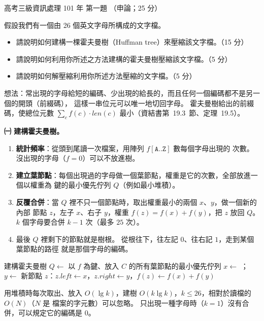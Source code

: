 \begin{pastexam}[label={px:gk3-101-ds-01}]{高考三級資訊處理 101 年 第一題}
（申論；25 分）

假設我們有一個由 26 個英文字母所構成的文字檔。
\begin{itemize}[leftmargin=2em, labelsep=0.3em, itemsep=2pt]
\item[㈠] 請說明如何建構一棵霍夫曼樹（Huffman tree）來壓縮該文字檔。（15 分）
\item[㈡] 請說明如何利用你所述之方法建構的霍夫曼樹壓縮該文字檔。（5 分）
\item[㈢] 請說明如何解壓縮利用你所述方法壓縮的文字檔。（5 分）
\end{itemize}
\end{pastexam}

\begin{pastsoln}
想法：常出現的字母給短的編碼、少出現的給長的，而且任何一個編碼都不是另一個的開頭（前綴碼），
這樣一串位元可以唯一地切回字母。 霍夫曼樹給出的前綴碼，使總位元數 $\sum_c f(c) \cdot
\mathit{len}(c)$ 最小（資結書第~19.3~節、定理~19.5）。

\textbf{㈠ 建構霍夫曼樹。}
\begin{enumerate}[nosep]
\item \textbf{統計頻率}：從頭到尾讀一次檔案，用陣列 $f[\texttt{A}..\texttt{Z}]$ 數每個字母出現的
次數。 沒出現的字母（$f = 0$）可以不放進樹。
\item \textbf{建立葉節點}：每個出現過的字母做一個葉節點，權重是它的次數，全部放進一個以權重為
鍵的最小優先佇列 $Q$（例如最小堆積）。
\item \textbf{反覆合併}：當 $Q$ 裡不只一個節點時，取出權重最小的兩個 $x$、$y$，做一個新的內部
節點 $z$，左子 $x$、右子 $y$，權重 $f(z) = f(x) + f(y)$，把 $z$ 放回 $Q$。 $k$ 個字母要合併
$k - 1$ 次（最多 $25$ 次）。
\item 最後 $Q$ 裡剩下的節點就是樹根。 從根往下，往左記 $0$、往右記 $1$，走到某個葉節點的路徑
就是那個字母的編碼。
\end{enumerate}
\begin{pseudo}{建構霍夫曼樹}
 
    \State $Q \gets$ 以 $f$ 為鍵、放入 $C$ 的所有葉節點的最小優先佇列
        \State $x \gets$ ；$y \gets$ 
        \State 新節點 $z$：$z.\mathit{left} \gets x$，$z.\mathit{right} \gets y$，$f(z) \gets f(x) + f(y)$
        \State {}
    \EndFor
    \State \Return {} 
\EndFunction
\end{pseudo}
用堆積時每次取出、放入 $O(\lg k)$，建樹 $O(k \lg k)$，$k \le 26$，相對於讀檔的 $O(N)$（$N$ 是
檔案的字元數）可以忽略。 只出現一種字母時（$k = 1$）沒有合併，可以規定它的編碼是 $0$。


\end{pastsoln}
